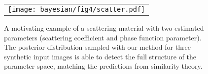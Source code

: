 \begin{figure}[!ht]
	\centering
	\begin{tabular}{c}
		\texttt{[image: bayesian/fig4/scatter.pdf]}
	\end{tabular}
	\caption[]{\label{fig:bayesian:scatter}
		A motivating example of a scattering material with two estimated parameters (scattering coefficient and phase function parameter). The posterior distribution sampled with our method for three synthetic input images is able to detect the full structure of the parameter space, matching the predictions from similarity theory.
	}
\end{figure}
